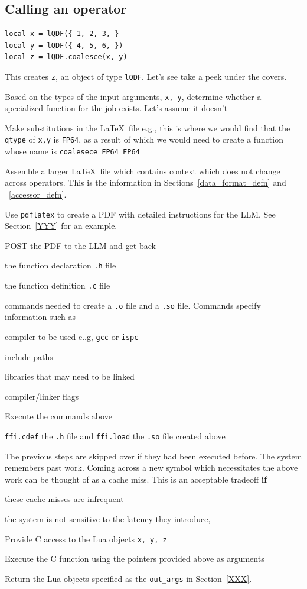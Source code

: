 \documentclass[letterpaper,12pt]{article}
\begin{document}
{  \subsection{Calling an operator}
  \begin{verbatim}
local x = lQDF({ 1, 2, 3, }
local y = lQDF({ 4, 5, 6, })
local z = lQDF.coalesce(x, y)
  \end{verbatim}

This creates {\tt z}, an object of type {\tt lQDF}. 
Let's see take a peek under the covers. 
\be
\item Based on the types of the input arguments, {\tt x, y}, 
  determine whether a specialized function for the job exists. Let's assume it
  doesn't
\item Make substitutions in the \LaTeX\ file e.g., this is where we 
  would find that the {\tt qtype} of {\tt x,y} is {\tt FP64}, as 
  a result of which we would need to create a function whose name is 
  \verb+coalesece_FP64_FP64+
\item Assemble a larger \LaTeX\ file which contains 
  context which does not change across operators. 
  This is the information in Sections~\ref{data_format_defn} and 
  ~\ref{accessor_defn}.
\item Use {\tt pdflatex} to create a PDF with detailed instructions for the LLM.
  See Section~\ref{YYY} for an example.
\item POST the PDF to the LLM and get back 
  \be
\item the function declaration {\tt .h} file 
\item the function definition {\tt .c} file 
\item commands needed to create a {\tt .o} file and a {\tt .so} file. 
 Commands specify information such as
  \be
\item compiler to be used e..g, {\tt gcc} or {\tt ispc}
\item include paths
\item libraries that may need to be linked
\item compiler/linker flags 
  \ee
  \ee
\item Execute the commands above
\item \verb+ffi.cdef+ the {\tt .h} file and \verb+ffi.load+ the {\tt .so} file
  created above
\item The previous steps are skipped over if they had been executed before. 
The system remembers past work. Coming across a new symbol which necessitates
the above work can be thought of as a cache miss. 
This is an acceptable tradeoff {\bf if}
\be
\item these cache misses are infrequent 
\item the system is not sensitive to the latency they introduce,
  \ee
\item Provide C access to the Lua objects {\tt x, y, z}
\item Execute the C function using the pointers provided above as arguments
\item Return the Lua objects specified as the {\tt out\_args} in
  Section~\ref{XXX}.
  \ee

}
\end{document}
